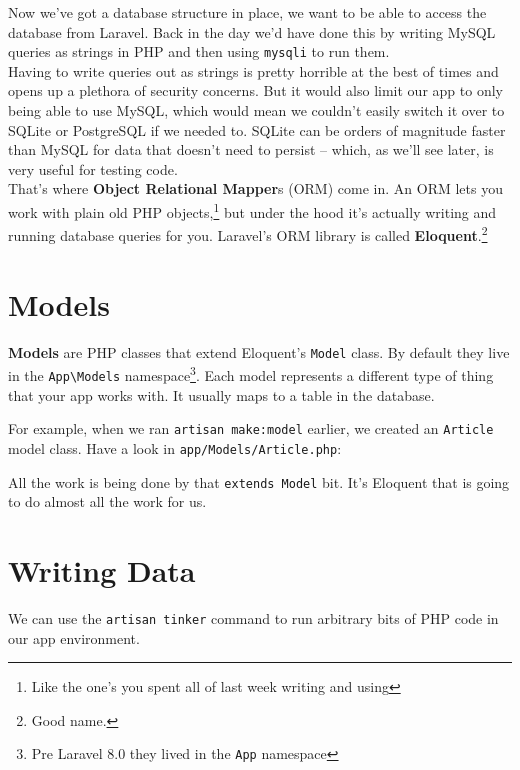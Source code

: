 Now we've got a database structure in place, we want to be able to access the database from Laravel. Back in the day we'd have done this by writing MySQL queries as strings in PHP and then using \texttt{mysqli} to run them.
\\

Having to write queries out as strings is pretty horrible at the best of times and opens up a plethora of security concerns. But it would also limit our app to only being able to use MySQL, which would mean we couldn't easily switch it over to SQLite or PostgreSQL if we needed to. SQLite can be orders of magnitude faster than MySQL for data that doesn't need to persist – which, as we'll see later, is very useful for testing code.
\\

That's where \textbf{Object Relational Mapper}s (ORM) come in. An ORM lets you work with plain old PHP objects,\footnote{Like the one's you spent all of last week writing and using} but under the hood it's actually writing and running database queries for you. Laravel's ORM library is called \textbf{Eloquent}.\footnote{Good name.}

\section{Models}

\textbf{Models} are PHP classes that extend Eloquent's \texttt{Model} class. By default they live in the \texttt{App\textbackslash{}Models} namespace\footnote{Pre Laravel 8.0 they lived in the \texttt{App} namespace}. Each model represents a different type of thing that your app works with. It usually maps to a table in the database.

\pagebreak

For example, when we ran \texttt{artisan make:model} earlier, we created an \texttt{Article} model class. Have a look in \texttt{app/Models/Article.php}:


All the work is being done by that \texttt{extends Model} bit. It's Eloquent that is going to do almost all the work for us.



\section{Writing Data}

We can use the \texttt{artisan tinker} command to run arbitrary bits of PHP code in our app environment.
\\

